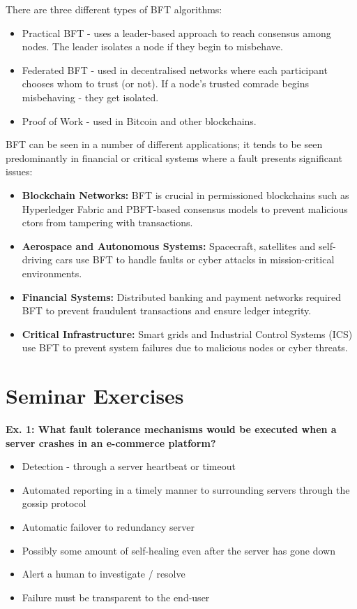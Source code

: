 There are three different types of BFT algorithms:
\begin{itemize}
    \item Practical BFT - uses a leader-based approach to reach consensus among nodes. The leader isolates a node if they begin to misbehave.
    \item Federated BFT - used in decentralised networks where each participant chooses whom to trust (or not). If a node's trusted comrade begins misbehaving - they get isolated. 
    \item Proof of Work - used in Bitcoin and other blockchains.
\end{itemize}

BFT can be seen in a number of different applications; it tends to be seen predominantly in financial or critical systems where a fault presents significant issues:
\begin{itemize}
    \item \textbf{Blockchain Networks:} BFT is crucial in permissioned blockchains such as Hyperledger Fabric and PBFT-based consensus models to prevent malicious ctors from tampering with transactions.
    \item \textbf{Aerospace and Autonomous Systems:} Spacecraft, satellites and self-driving cars use BFT to handle faults or cyber attacks in mission-critical environments.
    \item \textbf{Financial Systems:} Distributed banking and payment networks required BFT to prevent fraudulent transactions and ensure ledger integrity.
    \item \textbf{Critical Infrastructure:} Smart grids and Industrial Control Systems (ICS) use BFT to prevent system failures due to malicious nodes or cyber threats. 
\end{itemize}

\section{Seminar Exercises}

\textbf{Ex. 1: What fault tolerance mechanisms would be executed when a server crashes in an e-commerce platform?}
\begin{itemize}
    \item Detection - through a server heartbeat or timeout
    \item Automated reporting in a timely manner to surrounding servers through the gossip protocol
    \item Automatic failover to redundancy server
    \item Possibly some amount of self-healing even after the server has gone down
    \item Alert a human to investigate / resolve
    \item Failure must be transparent to the end-user
\end{itemize}

